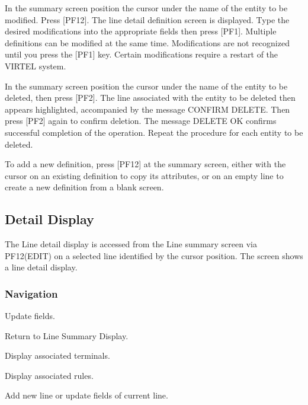 \documentclass[letterpaper,10pt,english]{sphinxmanual}
\begin{document}
\sphinxAtStartPar
{} \sphinxhyphen{} In the summary screen position the cursor under the name of the entity to be modified. Press {[}PF12{]}. The line detail definition screen is displayed. Type the desired modifications into the appropriate fields then press {[}PF1{]}. Multiple definitions can be modified at the same time. Modifications are not recognized until you press the {[}PF1{]} key. Certain modifications require a restart of the VIRTEL system.

\sphinxAtStartPar
{} \sphinxhyphen{} In the summary screen position the cursor under the name of the entity to be deleted, then press {[}PF2{]}. The line associated with the entity to be deleted then appears highlighted, accompanied by the message CONFIRM DELETE. Then press {[}PF2{]} again to confirm deletion. The message DELETE OK confirms successful completion of the operation. Repeat the procedure for each entity to be deleted.

\sphinxAtStartPar
{} \sphinxhyphen{} To add a new definition, press {[}PF12{]} at the summary screen, either with the cursor on an existing definition to copy its attributes, or on an empty line to create a new definition from a blank screen.

\newpage

\ignorespaces 

\subsection{Detail Display}
\label{\detokenize{connectivity_guide:detail-display}}\label{\detokenize{connectivity_guide:index-7}}
\sphinxAtStartPar
The Line detail display is accessed from the Line summary screen via PF12(EDIT) on a selected line identified by the cursor position. The screen shows a line detail display.

\sphinxAtStartPar
{}


\subsubsection{Navigation}
\label{\detokenize{connectivity_guide:id1}}\begin{description}
\sphinxlineitem{{[}PF1{]}}
\sphinxAtStartPar
Update fields.

\sphinxlineitem{{[}PF3{]}}
\sphinxAtStartPar
Return to Line Summary Display.

\sphinxlineitem{{[}PF4{]}}
\sphinxAtStartPar
Display associated terminals.

\sphinxlineitem{{[}PF5{]}}
\sphinxAtStartPar
Display associated rules.

\sphinxlineitem{{[}ENTER}
\sphinxAtStartPar
Add new line or update fields of current line.

\end{description}
\end{document}

